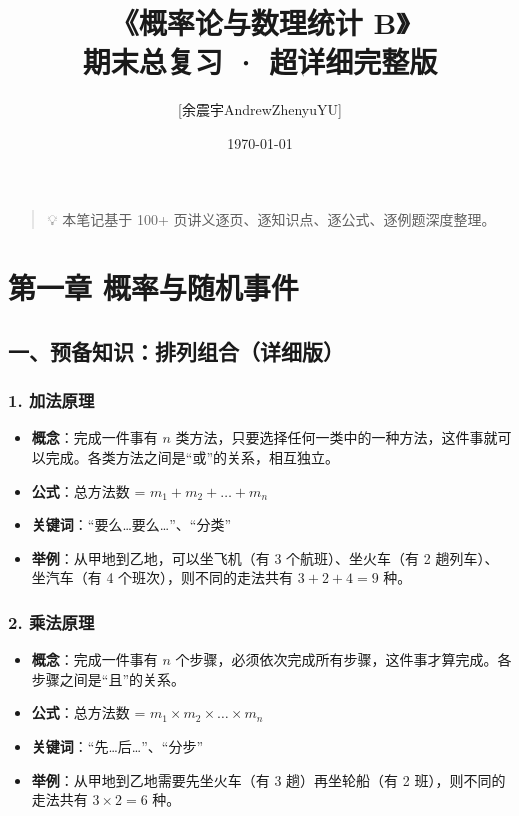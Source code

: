 \documentclass[12pt,a4paper]{ctexart}
\title{\Huge \textbf{《概率论与数理统计 B》} \\ \Large 期末总复习 · 超详细完整版}
\author{[余震宇AndrewZhenyuYU]}
\date{\today}
\newenvironment{myquote}
  {\par\vspace{0.5em}\begin{quote}\sffamily\color{darkgray}}
  {\end{quote}\vspace{0.5em}}
\begin{document}
\maketitle

\begin{myquote}
    💡 本笔记基于 100+ 页讲义逐页、逐知识点、逐公式、逐例题深度整理。
\end{myquote}

\tableofcontents
\newpage


\section{第一章 概率与随机事件}

\subsection{一、预备知识：排列组合（详细版）}

\subsubsection{1. 加法原理}
\begin{itemize}[noitemsep]
    \item \textbf{概念}：完成一件事有 $n$ 类方法，只要选择任何一类中的一种方法，这件事就可以完成。各类方法之间是“或”的关系，相互独立。
    \item \textbf{公式}：总方法数 = $m_1 + m_2 + \dots + m_n$
    \item \textbf{关键词}：“要么…要么…”、“分类”
    \item \textbf{举例}：从甲地到乙地，可以坐飞机（有 3 个航班）、坐火车（有 2 趟列车）、坐汽车（有 4 个班次），则不同的走法共有 $3+2+4=9$ 种。
\end{itemize}

\subsubsection{2. 乘法原理}
\begin{itemize}[noitemsep]
    \item \textbf{概念}：完成一件事有 $n$ 个步骤，必须依次完成所有步骤，这件事才算完成。各步骤之间是“且”的关系。
    \item \textbf{公式}：总方法数 = $m_1 \times m_2 \times \dots \times m_n$
    \item \textbf{关键词}：“先…后…”、“分步”
    \item \textbf{举例}：从甲地到乙地需要先坐火车（有 3 趟）再坐轮船（有 2 班），则不同的走法共有 $3 \times 2 = 6$ 种。
\end{itemize}
\end{document}
